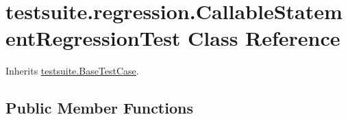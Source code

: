 \hypertarget{classtestsuite_1_1regression_1_1_callable_statement_regression_test}{}\section{testsuite.\+regression.\+Callable\+Statement\+Regression\+Test Class Reference}
\label{classtestsuite_1_1regression_1_1_callable_statement_regression_test}


Inherits \mbox{\hyperlink{classtestsuite_1_1_base_test_case}{testsuite.\+Base\+Test\+Case}}.

\subsection*{Public Member Functions}
